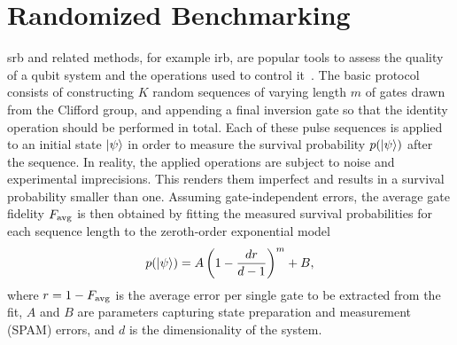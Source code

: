 \section{Randomized Benchmarking}\label{sec:ff:examples:randomized_benchmarking}
\Gls{srb} and related methods, for example \gls{irb}, are popular tools to assess the quality of a qubit system and the operations used to control it~\cite{Knill2008,Magesan2011,Magesan2012a}.
The basic protocol consists of constructing $K$ random sequences of varying length $m$ of gates drawn from the Clifford group,
and appending a final inversion gate so that the identity operation should be performed in total.
Each of these pulse sequences is applied to an initial state $\mbox{\ensuremath{\ket{\psi}}}$ in order to measure the survival probability $p(\mbox{\ensuremath{\ket{\psi}}})$ after the sequence.
In reality, the applied operations are subject to noise and experimental imprecisions.
This renders them imperfect and results in a survival probability smaller than one.
Assuming gate-independent errors, the average gate fidelity $F_{\mathrm{avg}}$ is then obtained by fitting the measured survival probabilities for each sequence length to the zeroth-order exponential model~\cite{Magesan2011}
\begin{equation}\label{eq:ff:SRB}
p(\mbox{\ensuremath{\ket{\psi}}}) = A \left(1 - \frac{dr}{d-1}\right)^m + B,
\end{equation}
where $r = 1 - F_{\mathrm{avg}}$ is the average error per single gate to be extracted from the fit, $A$ and $B$ are parameters capturing state preparation and measurement (SPAM) errors, and $d$ is the dimensionality of the system.

